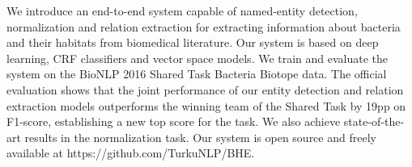 We introduce an end-to-end system capable of named-entity detection, normalization and relation extraction for extracting information about bacteria and their habitats from biomedical literature. Our system is based on deep learning, CRF classifiers and vector space models. We train and evaluate the system on the BioNLP 2016 Shared Task Bacteria Biotope data. The official evaluation shows that the joint performance of our entity detection and relation extraction models outperforms the winning team of the Shared Task by 19pp on F1-score, establishing a new top score for the task. We also achieve state-of-the-art results in the normalization task. Our system is open source and freely available at https://github.com/TurkuNLP/BHE.
